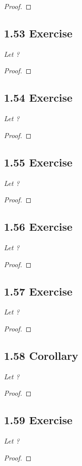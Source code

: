\documentclass{article}
\begin{document}
\begin{proof}
\end{proof}

\subsection*{1.53 Exercise} 
\quad \textit{Let ?}

\begin{proof}
\end{proof}

\subsection*{1.54 Exercise} 
\quad \textit{Let ?}

\begin{proof}
\end{proof}

\subsection*{1.55 Exercise} 
\quad \textit{Let ?}

\begin{proof}
\end{proof}

\subsection*{1.56 Exercise} 
\quad \textit{Let ?}

\begin{proof}
\end{proof}

\subsection*{1.57 Exercise} 
\quad \textit{Let ?}

\begin{proof}
\end{proof}

\subsection*{1.58 Corollary} 
\quad \textit{Let ?}

\begin{proof}
\end{proof}

\subsection*{1.59 Exercise} 
\quad \textit{Let ?}

\begin{proof}
\end{proof}
\end{document}
